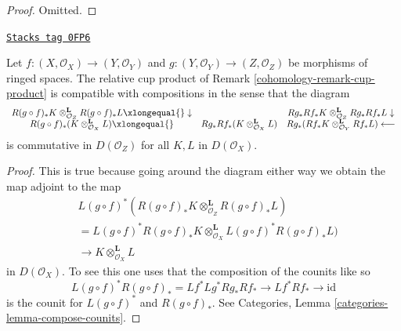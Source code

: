 \begin{proof}
Omitted.
\end{proof}

\begin{lemma}
\label{cohomology-lemma-compose-cup-product}
\href{https://stacks.math.columbia.edu/tag/0FP6}{\texttt{Stacks tag 0FP6}}

Let $f : (X, \mathcal{O}_X) \to (Y, \mathcal{O}_Y)$ and
$g : (Y, \mathcal{O}_Y) \to (Z, \mathcal{O}_Z)$
be morphisms of ringed spaces. The relative cup product of
Remark \ref{cohomology-remark-cup-product} is compatible with compositions
in the sense that the diagram
$$
\begin{array}{ccc}R(g \circ f)_*K \otimes_{\mathcal{O}_Z}^\mathbf{L} R(g \circ f)_*L
\xlongequal{}\downarrow &  & Rg_*Rf_*K \otimes_{\mathcal{O}_Z}^\mathbf{L} Rg_*Rf_*L \downarrow \\ R(g \circ f)_*(K \otimes_{\mathcal{O}_X}^\mathbf{L} L) \xlongequal{} & Rg_*Rf_*(K \otimes_{\mathcal{O}_X}^\mathbf{L} L) & Rg_*(Rf_*K \otimes_{\mathcal{O}_Y}^\mathbf{L}  Rf_*L) \longleftarrow\end{array}
$$
is commutative in $D(\mathcal{O}_Z)$ for all $K, L$ in $D(\mathcal{O}_X)$.
\end{lemma}

\begin{proof}
This is true because going around the diagram either way we obtain the map
adjoint to the map
\begin{align*}
& L(g \circ f)^*\left(R(g \circ f)_*K
\otimes_{\mathcal{O}_Z}^\mathbf{L}
R(g \circ f)_*L\right) \\
& =
L(g \circ f)^*R(g \circ f)_*K
\otimes_{\mathcal{O}_X}^\mathbf{L}
L(g \circ f)^*R(g \circ f)_*L) \\
& \to
K \otimes_{\mathcal{O}_X}^\mathbf{L} L
\end{align*}
in $D(\mathcal{O}_X)$. To see this one uses that the composition
of the counits like so
$$
L(g \circ f)^*R(g \circ f)_* =
Lf^* Lg^* Rg_* Rf_*  \to
Lf^* Rf_* \to \text{id}
$$
is the counit for $L(g \circ f)^*$ and $R(g \circ f)_*$. See
Categories, Lemma \ref{categories-lemma-compose-counits}.
\end{proof}

